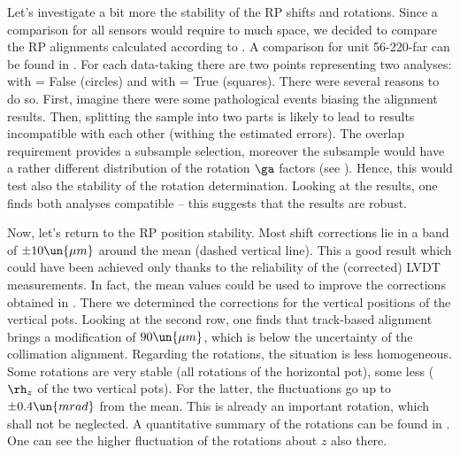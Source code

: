 Let's investigate a bit more the stability of the RP shifts and rotations. Since a comparison for all sensors would require to much space, we decided to compare the RP alignments calculated according to . A comparison for unit 56-220-far can be found in . For each data-taking there are two points representing two analyses: with  = False (circles) and with  = True (squares). There were several reasons to do so. First, imagine there were some pathological events biasing the alignment results. Then, splitting the sample into two parts is likely to lead to results incompatible with each other (withing the estimated errors). The overlap requirement provides a subsample selection, moreover the subsample would have a rather different distribution of the rotation $\ga$ factors (see ). Hence, this would test also the stability of the rotation determination. Looking at the results, one finds both analyses compatible -- this suggests that the results are robust.

Now, let's return to the RP position stability. Most shift corrections lie in a band of $\pm 10\un{\mu m}$ around the mean (dashed vertical line). This a good result which could have been achieved only thanks to the reliability of the (corrected) LVDT measurements. In fact, the mean values could be used to improve the corrections obtained in . There we determined the corrections for the vertical positions of the vertical pots. Looking at the second row, one finds that track-based alignment brings a modification of $90\un{\mu m}$, which is below the uncertainty of the collimation alignment. Regarding the rotations, the situation is less homogeneous. Some rotations are very stable (all rotations of the horizontal pot), some less ($\rh_z$ of the two vertical pots). For the latter, the fluctuations go up to $\pm 0.4\un{mrad}$ from the mean. This is already an important rotation, which shall not be neglected. A quantitative summary of the rotations can be found in . One can see the higher fluctuation of the rotations about $z$ also there.


